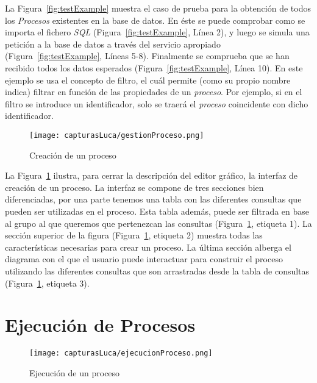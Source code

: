 La Figura~\ref{fig:testExample} muestra el caso de prueba para la obtención de todos los \emph{Procesos} existentes en la base de datos. En éste se puede comprobar como se importa el fichero \emph{SQL} (Figura~\ref{fig:testExample}, Línea 2), y luego se simula una petición a la base de datos a través del servicio apropiado (Figura~\ref{fig:testExample}, Líneas 5-8). Finalmente se comprueba que se han recibido todos los datos esperados (Figura~\ref{fig:testExample}, Línea 10). En este ejemplo se usa el concepto de filtro, el cuál permite (como su propio nombre indica) filtrar en función de las propiedades de un \emph{proceso}. Por ejemplo, si en el filtro se introduce un identificador, solo se traerá el \emph{proceso} coincidente con dicho identificador.

\begin{figure}[H]
	\centering
	\texttt{[image: capturasLuca/gestionProceso.png]}
	\caption{Creación de un proceso}
	\label{fig:gestionProceso}
\end{figure}

La Figura~\ref{fig:gestionProceso} ilustra, para cerrar la descripción del editor gráfico, la interfaz de creación de un proceso. La interfaz se compone de tres secciones bien diferenciadas, por una parte tenemos una tabla con las diferentes consultas que pueden ser utilizadas en el proceso. Esta tabla además, puede ser filtrada en base al grupo al que queremos que pertenezcan las consultas (Figura~\ref{fig:gestionProceso}, etiqueta 1). La sección superior de la figura (Figura~\ref{fig:gestionProceso}, etiqueta 2) muestra todas las características necesarias para crear un proceso. La última sección alberga el diagrama con el que el usuario puede interactuar para construir el proceso utilizando las diferentes consultas que son arrastradas desde la tabla de consultas (Figura~\ref{fig:gestionProceso}, etiqueta 3).

\section{Ejecución de Procesos}


\begin{figure}[H]
	\centering
	\texttt{[image: capturasLuca/ejecucionProceso.png]}
	\caption{Ejecución de un proceso}
	\label{fig:ejecucionProceso}
\end{figure}

